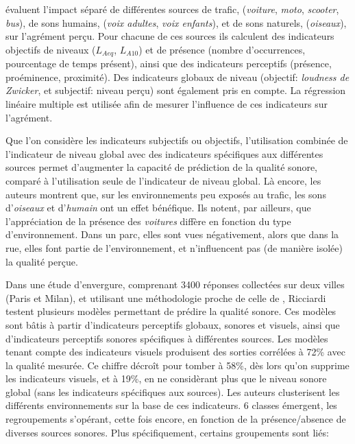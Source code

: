 \citep{defreville2004aactivity,lavandier2006contribution} évaluent l'impact séparé de différentes sources de trafic, (\emph{voiture}, \emph{moto}, \emph{scooter}, \emph{bus}), de sons humains, (\emph{voix adultes}, \emph{voix enfants}), et de sons naturels, (\emph{oiseaux}), sur l'agrément perçu. Pour chacune de ces sources ils calculent des indicateurs objectifs de niveaux ($L_{Aeq}$, $L_{A10}$) et de présence (nombre d’occurrences, pourcentage de temps présent), ainsi que des indicateurs perceptifs (présence, proéminence, proximité). Des indicateurs globaux de niveau (objectif: \emph{loudness de Zwicker}, et subjectif: niveau perçu) sont également pris en compte. La régression linéaire multiple est utilisée afin de mesurer l'influence de ces indicateurs sur l'agrément.

Que l'on considère les indicateurs subjectifs ou objectifs, l'utilisation combinée de l'indicateur de niveau global avec des indicateurs spécifiques aux différentes sources permet d'augmenter la capacité de prédiction de la qualité sonore, comparé à l'utilisation seule de l'indicateur de niveau global. Là encore, les auteurs montrent que, sur les environnements peu exposés au trafic, les sons d'\emph{oiseaux} et d'\emph{humain} ont un effet bénéfique. Ils notent, par ailleurs, que l'appréciation de la présence des \emph{voitures} diffère en fonction du type d'environnement. Dans un parc, elles sont vues négativement, alors que dans la rue, elles font partie de l'environnement, et n'influencent pas (de manière isolée) la qualité perçue.

Dans une étude d'envergure, comprenant 3400 réponses collectées sur deux villes (Paris et Milan), et utilisant une méthodologie proche de celle de \citep{lavandier2006contribution}, Ricciardi~\al \citep{ricciardi2015sound} testent plusieurs modèles permettant de prédire la qualité sonore. Ces modèles sont bâtis à partir d'indicateurs perceptifs globaux, sonores et visuels, ainsi que d'indicateurs perceptifs sonores spécifiques à différentes sources. Les modèles tenant compte des indicateurs visuels produisent des sorties corrélées à 72\% avec la qualité mesurée. Ce chiffre décroît pour tomber à 58\%, dès lors qu'on supprime les indicateurs visuels, et à 19\%, en ne considèrant plus que le niveau sonore global (sans les indicateurs spécifiques aux sources). Les auteurs clusterisent les différents environnements sur la base de ces indicateurs. 6 classes émergent, les regroupements s'opérant, cette fois encore, en fonction de la présence/absence de diverses sources sonores. Plus spécifiquement, certains groupements sont liés:

